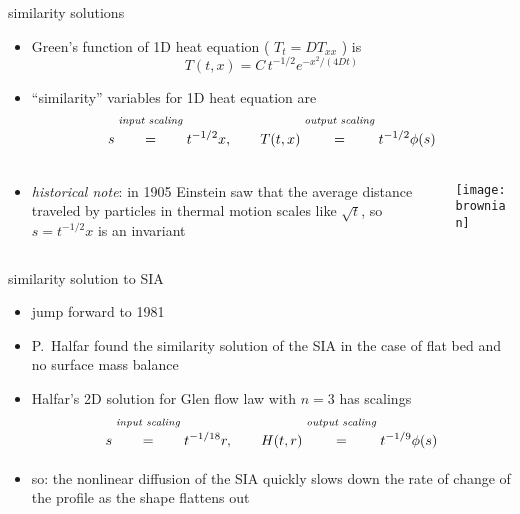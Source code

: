 \begin{frame}{similarity solutions}

\begin{itemize}
\item Green's function of 1D heat equation ( $T_t=D T_{xx}$ ) is
	$$T(t,x) = C\, t^{-1/2} e^{-x^2/(4Dt)}$$
\item ``similarity'' variables for 1D heat equation are
	$$s \stackrel{\text{\emph{input scaling}}}{\phantom{\Big|}=\phantom{\Big|}} t^{-1/2} x, \qquad T(t,x) \stackrel{\text{\emph{output scaling}}}{\phantom{\Big|}=\phantom{\Big|}} t^{-1/2} \phi(s)$$
\end{itemize}
\begin{columns}
\begin{column}{0.6\textwidth}
\begin{itemize}
\item \emph{historical note}:  in 1905 Einstein saw that the average distance traveled by particles in thermal motion scales like $\sqrt{t}$, so $s = t^{-1/2}x$ is an invariant
\end{itemize}
\end{column}
\begin{column}{0.4\textwidth}
\begin{center}
\texttt{[image: brownian]}
\end{center}
\end{column}
\end{columns}

\end{frame}


\begin{frame}{similarity solution to SIA}

\begin{itemize}
\item jump forward to 1981
\item P.~Halfar found the similarity solution of the SIA in the case of flat bed and no surface mass balance
\item Halfar's 2D solution for Glen flow law with $n=3$ has scalings
	$$s \stackrel{\text{\emph{input scaling}}}{\phantom{\Big|}=\phantom{\Big|}} t^{-1/18} r, \qquad H(t,r) \stackrel{\text{\emph{output scaling}}}{\phantom{\Big|}=\phantom{\Big|}} t^{-1/9} \phi(s)$$
\item so: the nonlinear diffusion of the SIA quickly slows down the rate of change of the profile as the shape flattens out
\end{itemize}
\end{frame}


